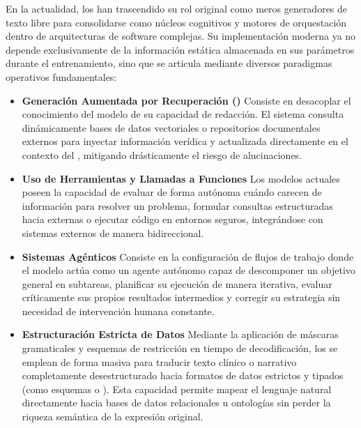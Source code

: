 En la actualidad, los  han trascendido su rol original como meros generadores de texto libre para
consolidarse como núcleos cognitivos y motores de orquestación dentro de arquitecturas de software complejas.
Su implementación moderna ya no depende exclusivamente de la información estática almacenada en sus parámetros 
durante el entrenamiento, sino que se articula mediante diversos paradigmas operativos fundamentales:
\begin{itemize}
    \item \textbf{Generación Aumentada por Recuperación ()} Consiste en desacoplar el conocimiento del modelo de su capacidad de redacción. El sistema consulta dinámicamente bases de datos vectoriales o 
    repositorios documentales externos para inyectar información verídica y actualizada directamente en el contexto del 
    , mitigando drásticamente el riesgo de alucinaciones.

    \item \textbf{Uso de Herramientas y Llamadas a Funciones}
    Los modelos actuales poseen la capacidad de evaluar de forma autónoma cuándo carecen de información
    para resolver un problema, formular consultas estructuradas hacia  externas o
    ejecutar código en entornos seguros, integrándose con sistemas externos de manera bidireccional.

    \item \textbf{Sistemas Agénticos} Consiste en la configuración de flujos de trabajo donde el 
    modelo actúa como un agente autónomo capaz de descomponer un objetivo general en subtareas, planificar su 
    ejecución de manera iterativa, evaluar críticamente sus propios resultados intermedios y corregir su estrategia 
    sin necesidad de intervención humana constante.
    
    \item \textbf{Estructuración Estricta de Datos} Mediante la aplicación de máscaras gramaticales y esquemas de restricción en 
    tiempo de decodificación, los  se emplean de forma masiva para traducir texto clínico o narrativo 
    completamente desestructurado hacia formatos de datos estrictos y tipados (como esquemas  
    o ). Esta capacidad permite mapear el lenguaje natural directamente hacia bases de datos relacionales 
    u ontologías sin perder la riqueza semántica de la expresión original.
\end{itemize}

